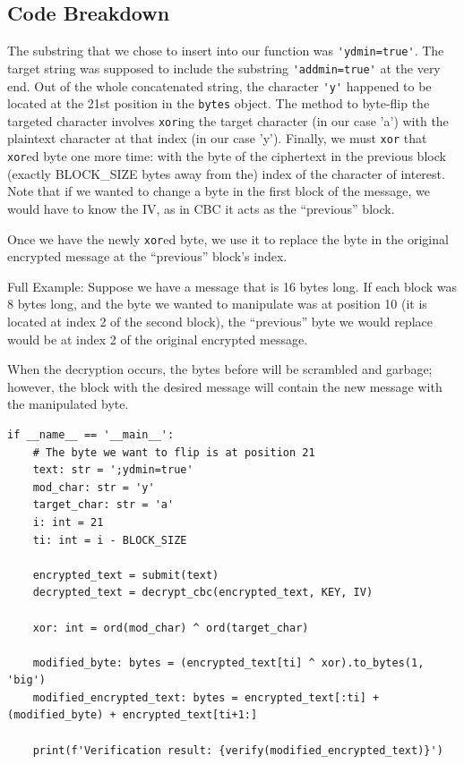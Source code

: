 \documentclass[11pt]{article}
\begin{document}
\subsection*{Code Breakdown}

The substring that we chose to insert into our function was \verb|'ydmin=true'|. The target string was supposed to include the substring \verb|'addmin=true'| at the very end. Out of the whole concatenated string, the character \verb|'y'| happened to be located at the 21st position in the \verb|bytes| object. The method to byte-flip the targeted character involves \verb|xor|ing the target character (in our case 'a') with the plaintext character at that index (in our case 'y'). Finally, we must \verb|xor| that \verb|xor|ed byte one more time: with the byte of the ciphertext in the previous block (exactly BLOCK\_SIZE bytes away from the) index of the character of interest. Note that if we wanted to change a byte in the first block of the message, we would have to know the IV, as in CBC it acts as the ``previous'' block.

Once we have the newly \verb|xor|ed byte, we use it to replace the byte in the original encrypted message at the ``previous'' block's index.

Full Example: Suppose we have a message that is 16 bytes long. If each block was 8 bytes long, and the byte we wanted to manipulate was at position 10 (it is located at index 2 of the second block), the ``previous'' byte we would replace would be at index 2 of the original encrypted message.

When the decryption occurs, the bytes before will be scrambled and garbage; however, the block with the desired message will contain the new message with the manipulated byte.

\begin{lstlisting}
if __name__ == '__main__':
    # The byte we want to flip is at position 21
    text: str = ';ydmin=true'
    mod_char: str = 'y'
    target_char: str = 'a'
    i: int = 21
    ti: int = i - BLOCK_SIZE

    encrypted_text = submit(text)
    decrypted_text = decrypt_cbc(encrypted_text, KEY, IV)

    xor: int = ord(mod_char) ^ ord(target_char)

    modified_byte: bytes = (encrypted_text[ti] ^ xor).to_bytes(1, 'big')
    modified_encrypted_text: bytes = encrypted_text[:ti] + (modified_byte) + encrypted_text[ti+1:]

    print(f'Verification result: {verify(modified_encrypted_text)}')
\end{lstlisting}
\end{document}
